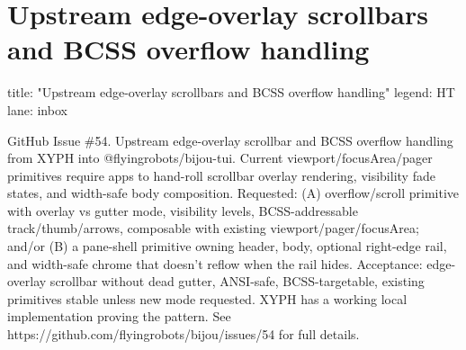 \chapter{Upstream edge-overlay scrollbars and BCSS overflow handling}\label{record-353}

\smallskip

\begin{RecordMeta}
title: "Upstream edge-overlay scrollbars and BCSS overflow handling"
legend: HT
lane: inbox

\end{RecordMeta}

GitHub Issue \#54. Upstream edge-overlay scrollbar and BCSS overflow handling from XYPH into @flyingrobots/bijou-tui. Current viewport/focusArea/pager primitives require apps to hand-roll scrollbar overlay rendering, visibility fade states, and width-safe body composition. Requested: (A) overflow/scroll primitive with overlay vs gutter mode, visibility levels, BCSS-addressable track/thumb/arrows, composable with existing viewport/pager/focusArea; and/or (B) a pane-shell primitive owning header, body, optional right-edge rail, and width-safe chrome that doesn't reflow when the rail hides. Acceptance: edge-overlay scrollbar without dead gutter, ANSI-safe, BCSS-targetable, existing primitives stable unless new mode requested. XYPH has a working local implementation proving the pattern. See https://github.com/flyingrobots/bijou/issues/54 for full details.

